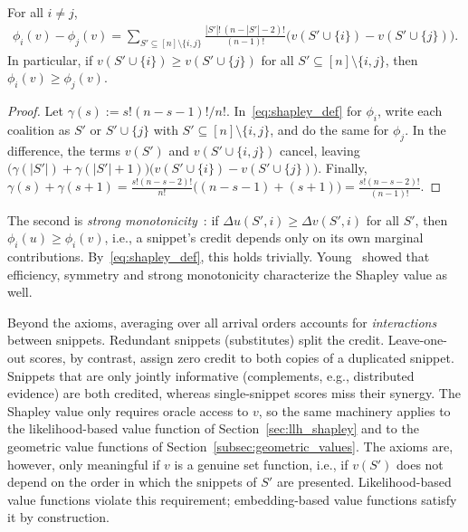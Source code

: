 \begin{lemma}[Desirability]\label{lem:desirability}
For all $i \neq j$,
\begin{align}
    \phi_i(v) - \phi_j(v) = \sum_{S' \subseteq [n] \setminus \{i,j\}} \frac{|S'|!\,(n - |S'| - 2)!}{(n-1)!} \big( v(S' \cup \{i\}) - v(S' \cup \{j\}) \big).
\end{align}
In particular, if $v(S' \cup \{i\}) \ge v(S' \cup \{j\})$ for all $S' \subseteq [n] \setminus \{i,j\}$, then $\phi_i(v) \ge \phi_j(v)$.
\end{lemma}

\begin{proof}
Let $\gamma(s) := s!(n-s-1)!/n!$. In~\eqref{eq:shapley_def} for $\phi_i$, write each coalition as $S'$ or $S' \cup \{j\}$ with $S' \subseteq [n] \setminus \{i,j\}$, and do the same for $\phi_j$. In the difference, the terms $v(S')$ and $v(S' \cup \{i,j\})$ cancel, leaving $\big(\gamma(|S'|) + \gamma(|S'|+1)\big)\big(v(S' \cup \{i\}) - v(S' \cup \{j\})\big)$. Finally, $\gamma(s) + \gamma(s+1) = \frac{s!(n-s-2)!}{n!}\big((n-s-1) + (s+1)\big) = \frac{s!(n-s-2)!}{(n-1)!}$.
\end{proof}

The second is \emph{strong monotonicity}~\cite{young1985monotonic}: if $\Delta u(S', i) \ge \Delta v(S', i)$ for all $S'$, then $\phi_i(u) \ge \phi_i(v)$, i.e., a snippet's credit depends only on its own marginal contributions. By~\eqref{eq:shapley_def}, this holds trivially. Young~\cite{young1985monotonic} showed that efficiency, symmetry and strong monotonicity characterize the Shapley value as well.

Beyond the axioms, averaging over all arrival orders accounts for \emph{interactions} between snippets. Redundant snippets (substitutes) split the credit. Leave-one-out scores, by contrast, assign zero credit to both copies of a duplicated snippet. Snippets that are only jointly informative (complements, e.g., distributed evidence) are both credited, whereas single-snippet scores miss their synergy. The Shapley value only requires oracle access to $v$, so the same machinery applies to the likelihood-based value function of Section~\ref{sec:llh_shapley} and to the geometric value functions of Section~\ref{subsec:geometric_values}. The axioms are, however, only meaningful if $v$ is a genuine set function, i.e., if $v(S')$ does not depend on the order in which the snippets of $S'$ are presented. Likelihood-based value functions violate this requirement; embedding-based value functions satisfy it by construction.

